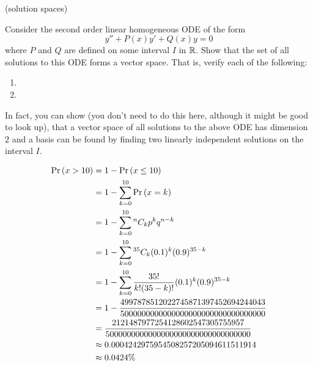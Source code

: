(solution spaces)

\nl Consider the second order linear homogeneous ODE of the form 
$$y'' + P(x)y' + Q(x)y = 0$$
where $P$ and $Q$ are defined on some interval $I$ in $\mathbb{R}$. Show that the set of all solutions to this ODE forms a vector space. That is, verify each of the following:

\begin{enumerate}
\item \vspace{0.25in}
\item 
\end{enumerate}

\vspace{.5in}
In fact, you can show (you don't need to do this here, although it might be good to look up), that a vector space of all solutions to the above ODE has dimension 2 and a basis can be found by finding two linearly independent solutions on the interval $I$.


\nnl
\begin{align*}
    \P{x > 10} &= 1 - \P{x \leq 10}\\
    &= 1 - \sum_{k=0}^{10} \P{x = k} \\
    &= 1 - \sum_{k=0}^{10} {}^nC_k p^k q^{n-k}\\
    &= 1 - \sum_{k=0}^{10} {}^{35}C_k (0.1)^k (0.9)^{35-k}\\
    &= 1 - \sum_{k=0}^{10} \frac{35!}{k!(35-k)!}  (0.1)^k (0.9)^{35-k}\\
    &= 1 - \frac{4997878512022745871397452694244043}{5000000000000000000000000000000000}\\
    &= \frac{2121487977254128602547305755957}{5000000000000000000000000000000000} \\
    &\approx 0.0004242975954508257205094611511914\\
    &\approx 0.0424\%
\end{align*}
